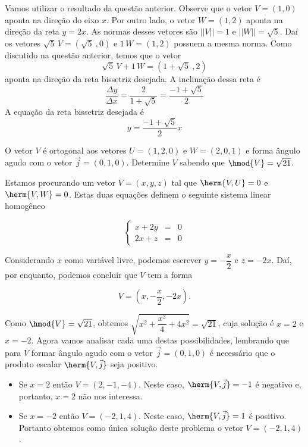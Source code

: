 \begin{solution}
Vamos utilizar o resultado da questão anterior. Observe que o vetor \linebreak
$V=(1,0)$ aponta na direção do eixo $x$.
Por outro lado, o vetor $W=(1,2)$ aponta na direção da reta $y=2x$.
As normas desses vetores são $||V||=1$ e $||W||=\sqrt{5}$.
Daí os vetores $\sqrt{5}\, V = \left(\sqrt{5}\ ,0\right)$ e $1\, W = (1,2)$ possuem a mesma norma.
Como discutido na questão anterior, temos que o vetor
$$\sqrt{5}\, V + 1\, W = \left(1 + \sqrt{5}\ , 2\right)$$ 
aponta na direção da reta bissetriz desejada.
A inclinação dessa reta é 
$$\dfrac{\Delta y}{\Delta x} = \dfrac{2}{1+\sqrt{5}} = \dfrac{-1 + \sqrt{5}}{2}$$
A equação da reta bissetriz desejada é
$$y =  \dfrac{-1 + \sqrt{5}}{2} x$$

\end{solution}


\begin{problem}
O vetor $V$ é ortogonal aos vetores $U=(1,2,0)$ e $W=(2,0,1)$ e forma ângulo agudo com o vetor $\vec{j}=(0,1,0)$. Determine $V$ sabendo que
$\hmod{V} = \sqrt{21}$.
\end{problem}

\begin{solution}
Estamos procurando um vetor $V=(x,y,z)$ tal que $\herm{V,U}=0$ e $\herm{V,W}=0$. Estas duas equações definem o seguinte sistema linear homogêneo

$$\left\{ \begin{array}{ccc} x+2y & = & 0 \\ 2x+z & = & 0 \end{array} \right.$$

Considerando $x$ como variável livre, podemos escrever $y=-\dfrac{x}{2}$ e $z=-2x$. Daí, por enquanto, podemos concluir que $V$ tem a forma

$$V = \left(  x, -\dfrac{x}{2} , -2x \right) .$$   

\medskip
Como $\hmod{V}=\sqrt{21}$, obtemos $\sqrt{x^2 + \dfrac{x^2}{4} + 4x^2} = \sqrt{21}$, cuja solução é $x=2$ e $x=-2$. Agora vamos analisar cada uma destas possibilidades, lembrando que para $V$ formar ângulo agudo com o vetor $\vec{j}=(0,1,0)$ é necessário que o produto escalar $\herm{V,\vec{j}}$ seja positivo.

\begin{itemize}
\item Se $x=2$ então $V = \left( 2 , -1 , -4 \right)$. Neste caso, $\herm{V,\vec{j}}=-1$ é negativo e, portanto, $x=2$ não nos interessa.

\item Se $x=-2$ então $V = \left( -2 , 1 , 4 \right)$. Neste caso, $\herm{V,\vec{j}}=1$ é positivo. Portanto obtemos como única solução deste problema o vetor $V = \left( -2 , 1 , 4 \right)$. 
\end{itemize}
\end{solution}


